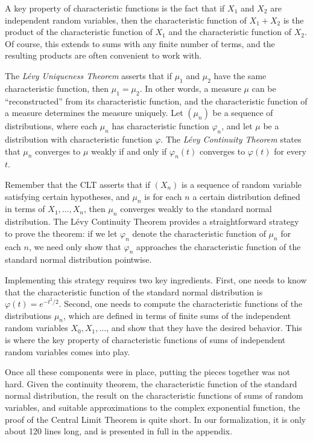 \documentclass{svjour3}
\newcommand{\ph}{\varphi}
\begin{document}
A key property of characteristic functions is the fact that if $X_1$ and $X_2$ are independent random variables, then the characteristic function of $X_1 + X_2$ is the product of the characteristic function of $X_1$ and the characteristic function of $X_2$. Of course, this extends to sums with any finite number of terms, and the resulting products are often convenient to work with.

The \emph{L\'evy Uniqueness Theorem} asserts that if $\mu_1$ and $\mu_2$ have the same characteristic function, then $\mu_1 = \mu_2$. In other words, a measure $\mu$ can be ``reconstructed'' from its characteristic function, and the characteristic function of a measure determines the measure uniquely.  Let $(\mu_n)$ be a sequence of distributions, where each $\mu_n$ has characteristic function $\ph_n$, and let $\mu$ be a distribution with characteristic function $\ph$. The \emph{L\'evy Continuity Theorem} states that $\mu_n$ converges to $\mu$ weakly if and only if $\ph_n(t)$ converges to $\ph(t)$ for every $t$.

Remember that the CLT asserts that if $(X_n)$ is a sequence of random variable satisfying certain hypotheses, and $\mu_n$ is for each $n$ a certain distribution defined in terms of $X_1, \ldots, X_n$, then $\mu_n$ converges weakly to the standard normal distribution. The L\'evy Continuity Theorem provides a straightforward strategy to prove the theorem: if we let $\ph_n$ denote the characteristic function of $\mu_n$ for each $n$, we need only show that $\ph_n$ approaches the characteristic function of the standard normal distribution pointwise.

Implementing this strategy requires two key ingredients. First, one needs to know that the characteristic function of the standard normal distribution is $\ph(t) = e^{-t^2/2}$. Second, one needs to compute the characteristic functions of the distributions $\mu_n$, which are defined in terms of finite sums of the independent random variables $X_0, X_1, \ldots$, and show that they have the desired behavior. This is where the key property of characteristic functions of sums of independent random variables comes into play.

Once all these components were in place, putting the pieces together was not hard. Given the continuity theorem, the characteristic function of the standard normal distribution, the result on the characteristic functions of sums of random variables, and suitable approximations to the complex exponential function, the proof of the Central Limit Theorem is quite short. In our formalization, it is only about 120 lines long, and is presented in full in the appendix.
\end{document}
